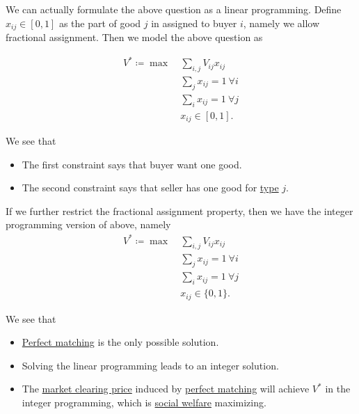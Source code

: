We can actually formulate the above question as a linear programming. Define \(x_{ij} \in [0, 1]\) as the part of
good \(j\) in assigned to buyer \(i\), namely we allow fractional assignment. Then we model the above question as

\begin{align*}
	V^{\ast} \coloneqq \max~ & \sum\limits_{i, j}V_{ij}x_{ij}       \\
	                         & \sum\limits_{j}x_{ij} = 1\ \forall i \\
	                         & \sum\limits_{i}x_{ij} = 1\ \forall j \\
	                         & x_{ij}\in[0, 1].
\end{align*}
\begin{intuition}
	We see that
	\begin{itemize}
		\item The first constraint says that buyer want one good.
		\item The second constraint says that seller has one good for \hyperref[def:type]{type} \(j\).
	\end{itemize}
\end{intuition}

If we further restrict the fractional assignment property, then we have the integer programming version of above, namely
\begin{align*}
	V^{\ast} \coloneqq \max~ & \sum\limits_{i, j}V_{ij}x_{ij}       \\
	                         & \sum\limits_{j}x_{ij} = 1\ \forall i \\
	                         & \sum\limits_{i}x_{ij} = 1\ \forall j \\
	                         & x_{ij}\in\{0, 1\}.
\end{align*}

\begin{remark}
	We see that
	\begin{itemize}
		\item \hyperref[def:perfect-matching]{Perfect matching} is the only possible solution.
		\item Solving the linear programming leads to an integer solution.
		\item The \hyperref[note:market-clearing-prices]{market clearing price} induced by \hyperref[def:perfect-matching]{perfect matching}
		      will achieve \(V^{\ast}\) in the integer programming, which is \hyperref[def:social-welfare]{social welfare} maximizing.
	\end{itemize}
\end{remark}

